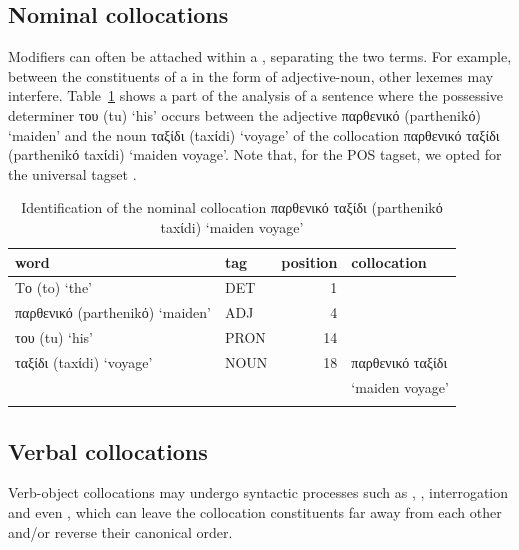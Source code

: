 \documentclass[output=paper]{langsci/langscibook}
\begin{document}
\subsection{ Nominal collocations}
Modifiers can often be attached within a , separating the two terms. For example, between the constituents of a  in the form of adjective-noun, other lexemes may interfere. Table~\ref{fou:fig1} shows a part of the analysis of a sentence where the possessive determiner {του} (tu) `his' occurs between the adjective  {παρθενικό} (parthenikό) `maiden' and the noun {ταξίδι} (taxίdi) `voyage' of the collocation {παρθενικό ταξίδι} (parthenikό taxίdi) `maiden voyage'. Note that, for the POS tagset, we opted for the universal tagset \citep{petrov12}. 

\begin{table}[h]
  {\small
    \begin{tabular}{llrl}
      \lsptoprule
      word & tag & position & collocation \\ %
      \midrule
          {Το} (to) `the' & DET & 1\\
          {παρθενικό} (parthenikό) `maiden' & ADJ & 4 \\
          {του } (tu) `his' & PRON & 14 \\
          {ταξίδι} (taxίdi) `voyage' & NOUN & 18 & {παρθενικό ταξίδι} \\
          & & & `maiden voyage' \tabularnewline
          \lspbottomrule
    \end{tabular}
  }
\caption{\label{fou:fig1}Identification of the nominal collocation {παρθενικό ταξίδι} (parthenikό taxίdi) `maiden voyage'}
\end{table} 


\subsection{Verbal collocations}
Verb-object collocations may undergo syntactic processes such as , , interrogation and even , which can leave the collocation constituents far away from each other and/or reverse their canonical order.



\end{document}
